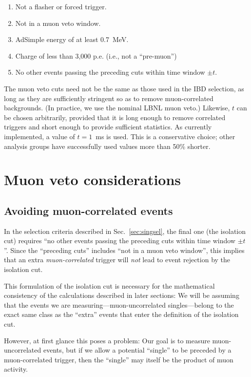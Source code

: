 \documentclass[../thesis.tex]{subfiles}
\begin{document}
\begin{enumerate}
\item Not a flasher or forced trigger.
\item Not in a muon veto window.
\item AdSimple energy of at least 0.7~MeV.
\item Charge of less than 3,000 p.e. (i.e., not a ``pre-muon'')
\item No other events passing the preceding cuts within time window $\pm t$.
\end{enumerate}

The muon veto cuts need not be the same as those used in the IBD selection, as long as they are sufficiently stringent so as to remove muon-correlated backgrounds. (In practice, we use the nominal LBNL muon veto.) Likewise, $t$ can be chosen arbitrarily, provided that it is long enough to remove correlated triggers and short enough to provide sufficient statistics. As currently implemented, a value of $t = 1$~ms is used. This is a conservative choice; other analysis groups have successfully used values more than 50\% shorter.

\section{Muon veto considerations}
\label{sec:effdecoup}

\subsection{Avoiding muon-correlated events}

In the selection criteria described in Sec.~\ref{sec:singsel}, the final one  (the isolation cut) requires ``no other events passing the preceding cuts within time window $\pm t$''. Since the ``preceding cuts'' includes ``not in a muon veto window'', this implies that an extra \emph{muon-correlated} trigger will \emph{not} lead to event rejection by the isolation cut.

This formulation of the isolation cut is necessary for the mathematical consistency of the calculations described in later sections: We will be assuming that the events we are measuring---muon-uncorrelated singles---belong to the exact same class as the ``extra'' events that enter the definition of the isolation cut.

However, at first glance this poses a problem: Our goal is to measure muon-uncorrelated events, but if we allow a potential ``single'' to be preceded by a muon-correlated trigger, then the ``single'' may itself be the product of muon activity. 
\end{document}
